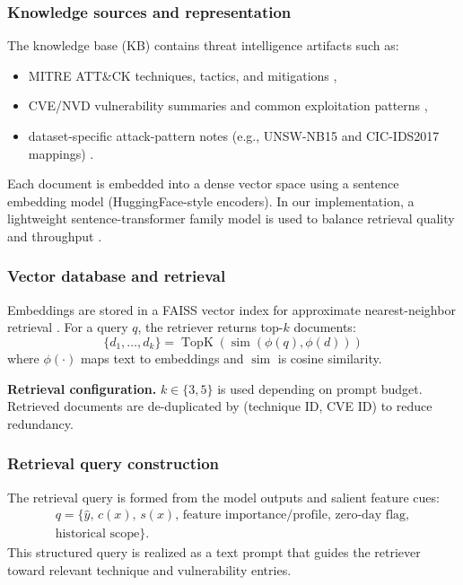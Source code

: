\documentclass[conference]{IEEEtran}
\begin{document}
\subsubsection{Knowledge sources and representation}
The knowledge base (KB) contains threat intelligence artifacts such as:
\begin{itemize}
  \item MITRE ATT\&CK techniques, tactics, and mitigations \cite{MITREATTACK},
  \item CVE/NVD vulnerability summaries and common exploitation patterns \cite{MITRECVE,NISTNVD},
  \item dataset-specific attack-pattern notes (e.g., UNSW-NB15 and CIC-IDS2017 mappings) \cite{Moustafa2015UNSW,Sharafaldin2018CICIDS}.
\end{itemize}
Each document is embedded into a dense vector space using a sentence embedding model (HuggingFace-style encoders). In our implementation, a lightweight sentence-transformer family model is used to balance retrieval quality and throughput \cite{Reimers2019SentenceBERT}.

\subsubsection{Vector database and retrieval}
Embeddings are stored in a FAISS vector index for approximate nearest-neighbor retrieval \cite{Johnson2019FAISS}. For a query $q$, the retriever returns top-$k$ documents:
\begin{equation}
 \{d_1,\dots,d_k\} = \operatorname{TopK}(\operatorname{sim}(\phi(q),\phi(d)))
\end{equation}
where $\phi(\cdot)$ maps text to embeddings and $\operatorname{sim}$ is cosine similarity.

\textbf{Retrieval configuration.} $k\in\{3,5\}$ is used depending on prompt budget. Retrieved documents are de-duplicated by (technique ID, CVE ID) to reduce redundancy.

\subsubsection{Retrieval query construction}
The retrieval query is formed from the model outputs and salient feature cues:
\begin{equation}
\begin{split}
q = \{ \hat{y},\, c(x),\, s(x),\, \text{feature importance/profile},\, \text{zero-day flag}, \\
\text{historical scope} \}.
\end{split}
\end{equation}
This structured query is realized as a text prompt that guides the retriever toward relevant technique and vulnerability entries.
\end{document}

